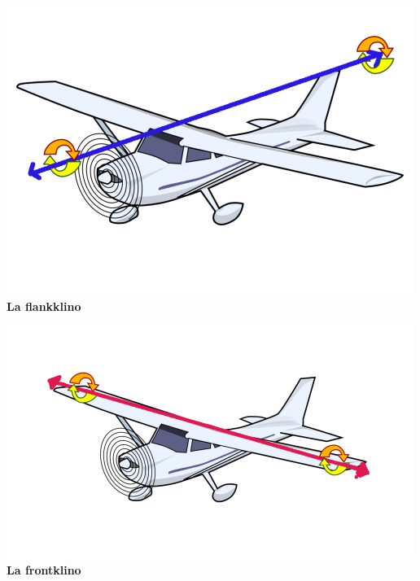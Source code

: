 \begin{minipage}{5.8cm}
\begin{center}
\includegraphics*[scale=0.3]{bildoj/plane-roll.png}
\textbf{La flankklino}
\end{center}
\end{minipage}
\begin{minipage}{5.5cm}
\begin{center}
\includegraphics*[scale=0.35]{bildoj/plane-pitch.png}
\textbf{La frontklino}
\end{center}
\end{minipage}
